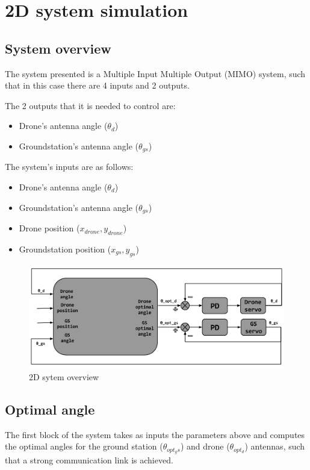 \section{2D system simulation}

\subsection{System overview}
The system presented is a Multiple Input Multiple Output (MIMO) system, such that in this case there are 4 inputs and 2 outputs. 

The 2 outputs that it is needed to control are:
\begin{itemize}
	\item Drone's antenna angle ($\theta_{d}$)
	\item Groundstation's antenna angle ($\theta_{gs}$)
\end{itemize}

The system's inputs are as follows:
\begin{itemize}
	\item Drone's antenna angle ($\theta_{d}$)
	\item Groundstation's antenna angle ($\theta_{gs}$)
	\item Drone position ($x_{drone},y_{drone}$)
	\item Groundstation position ($x_{gs},y_{gs}$)
\end{itemize}

\begin{figure}
	\centering
	\includegraphics[scale=0.42]{figures/2d_system.png}
	\caption{2D sytem overview}
	\label{fig:2d_system}
\end{figure}

\subsection{Optimal angle}
The first block of the system takes as inputs the parameters above and computes the optimal angles for the ground station ($\theta_{opt_gs}$) and drone ($\theta_{opt_d}$) antennas, such that a strong communication link is achieved.  



\subsection{}
